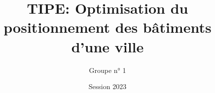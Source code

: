 






\title[TIPE Packastan]{TIPE: Optimisation du positionnement des bâtiments d'une ville}

\author[Andrieu, Petitjean, Maître]{Groupe n° 1}


\date{Session 2023}
















